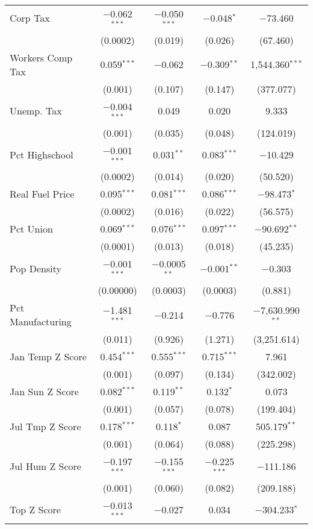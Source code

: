 \begin{table}[!htbp]
\begin{tabular}{@{\extracolsep{5pt}}lcccc}
  Corp Tax & $-$0.062$^{***}$ & $-$0.050$^{***}$ & $-$0.048$^{*}$ & $-$73.460 \\ 
  & (0.0002) & (0.019) & (0.026) & (67.460) \\ 
  Workers Comp Tax & 0.059$^{***}$ & $-$0.062 & $-$0.309$^{**}$ & 1,544.360$^{***}$ \\ 
  & (0.001) & (0.107) & (0.147) & (377.077) \\ 
  Unemp. Tax & $-$0.004$^{***}$ & 0.049 & 0.020 & 9.333 \\ 
  & (0.001) & (0.035) & (0.048) & (124.019) \\ 
  Pct Highschool & $-$0.001$^{***}$ & 0.031$^{**}$ & 0.083$^{***}$ & $-$10.429 \\ 
  & (0.0002) & (0.014) & (0.020) & (50.520) \\ 
  Real Fuel Price & 0.095$^{***}$ & 0.081$^{***}$ & 0.086$^{***}$ & $-$98.473$^{*}$ \\ 
  & (0.0002) & (0.016) & (0.022) & (56.575) \\ 
  Pct Union & 0.069$^{***}$ & 0.076$^{***}$ & 0.097$^{***}$ & $-$90.692$^{**}$ \\ 
  & (0.0001) & (0.013) & (0.018) & (45.235) \\ 
  Pop Density & $-$0.001$^{***}$ & $-$0.0005$^{**}$ & $-$0.001$^{**}$ & $-$0.303 \\ 
  & (0.00000) & (0.0003) & (0.0003) & (0.881) \\ 
  Pct Manufacturing & $-$1.481$^{***}$ & $-$0.214 & $-$0.776 & $-$7,630.990$^{**}$ \\ 
  & (0.011) & (0.926) & (1.271) & (3,251.614) \\ 
  Jan Temp Z Score & 0.454$^{***}$ & 0.555$^{***}$ & 0.715$^{***}$ & 7.961 \\ 
  & (0.001) & (0.097) & (0.134) & (342.002) \\ 
  Jan Sun Z Score & 0.082$^{***}$ & 0.119$^{**}$ & 0.132$^{*}$ & 0.073 \\ 
  & (0.001) & (0.057) & (0.078) & (199.404) \\ 
  Jul Tmp Z Score & 0.178$^{***}$ & 0.118$^{*}$ & 0.087 & 505.179$^{**}$ \\ 
  & (0.001) & (0.064) & (0.088) & (225.298) \\ 
  Jul Hum Z Score & $-$0.197$^{***}$ & $-$0.155$^{***}$ & $-$0.225$^{***}$ & $-$111.186 \\ 
  & (0.001) & (0.060) & (0.082) & (209.188) \\ 
  Top Z Score & $-$0.013$^{***}$ & $-$0.027 & 0.034 & $-$304.233$^{*}$ \\ 

\end{tabular}
\end{table}
